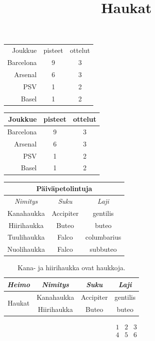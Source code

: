 \documentclass[a4paper]{article}
\theoremstyle{definition}
\theoremstyle{remark}
\begin{document}
\begin{tabular}{r|cc}
Joukkue & pisteet & ottelut \\
Barcelona & 9 & 3 \\
Arsenal & 6 & 3 \\
PSV & 1 & 2 \\
Basel & 1 & 2\\
\end{tabular}

\begin{tabular}{r||c|c}
Joukkue & pisteet & ottelut \\
\hline
Barcelona & 9 & 3 \\
Arsenal & 6 & 3 \\ \cline{2-3}
PSV & 1 & 2 \\ 
Basel & 1 & 2\\
\end{tabular}

\begin{tabular}{|c|c|c|}
\hline
\multicolumn{3}{|c|}{\textbf{Päiväpetolintuja}} \\
\hline
\textit{Nimitys} &\textit{Suku} &\textit{Laji} \\
\hline
Kanahaukka & Accipiter & gentilis \\
Hiirihaukka & Buteo & buteo \\
Tuulihaukka & Falco & columbarius \\
Nuolihaukka & Falco & subbuteo \\
\hline
\end{tabular}



\begin{table} [htb]
\title{Haukat}
\begin{tabular}{|c|c|c|c|}
\hline
\textit{Heimo} &\textit{Nimitys} &\textit{Suku} &\textit{Laji} \\
\hline
\multirow{2}{*}{Haukat} &Kanahaukka & Accipiter & gentilis \\
\cline{2-4} & Hiirihaukka & Buteo & buteo \\
\hline
\end{tabular}
\caption{Kana- ja hiirihaukka ovat haukkoja.}
\label{haukat}
\end{table}

\[
\begin{matrix}
1 & 2 & 3 \\
4 & 5 & 6 \\
\end{matrix}
\]
\end{document}
